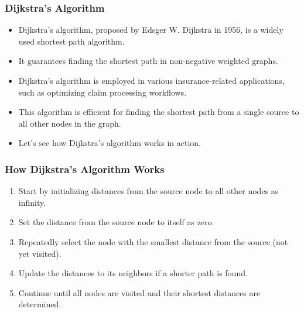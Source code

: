 \begin{frame}[fragile]\frametitle{Dijkstra's Algorithm}
\begin{itemize}
\item Dijkstra's algorithm, proposed by Edsger W. Dijkstra in 1956, is a widely used shortest path algorithm.
\item It guarantees finding the shortest path in non-negative weighted graphs.
\item Dijkstra's algorithm is employed in various insurance-related applications, such as optimizing claim processing workflows.
\item This algorithm is efficient for finding the shortest path from a single source to all other nodes in the graph.
\item Let's see how Dijkstra's algorithm works in action.
\end{itemize}
\end{frame}

\begin{frame}[fragile]\frametitle{How Dijkstra's Algorithm Works}
\begin{enumerate}
\item Start by initializing distances from the source node to all other nodes as infinity.
\item Set the distance from the source node to itself as zero.
\item Repeatedly select the node with the smallest distance from the source (not yet visited).
\item Update the distances to its neighbors if a shorter path is found.
\item Continue until all nodes are visited and their shortest distances are determined.
\end{enumerate}
\end{frame}

